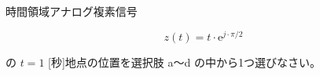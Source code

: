 時間領域アナログ複素信号 

\[
z(t) = t \cdot \textrm{e}^{j \cdot \pi / 2}
\]

\medskip
\noindent の $t = 1$ [秒]地点の位置を選択肢 a〜d の中から1つ選びなさい。
